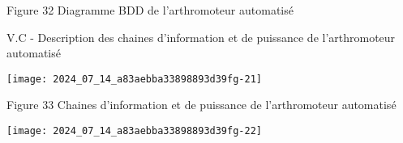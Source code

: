 Figure 32 Diagramme BDD de l'arthromoteur automatisé

V.C - Description des chaines d'information et de puissance de l'arthromoteur automatisé

\begin{center}
\texttt{[image: 2024\_07\_14\_a83aebba33898893d39fg-21]}
\end{center}

Figure 33 Chaines d'information et de puissance de l'arthromoteur automatisé

\begin{center}
\texttt{[image: 2024\_07\_14\_a83aebba33898893d39fg-22]}
\end{center}

